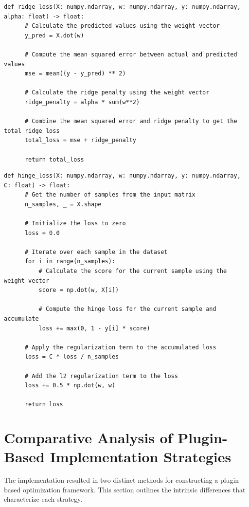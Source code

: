 \documentclass[
  a4paper,  %
  twoside,  %
  bibliography=totoc,
  headsepline,
  cleardoublepage=empty,
  parskip=half,
  draft=false
]{scrbook}
\begin{document}
\begin{lstlisting}[caption={Ridge Loss Calculation}, label=alg:ridge_loss]
  def ridge_loss(X: numpy.ndarray, w: numpy.ndarray, y: numpy.ndarray, alpha: float) -> float:
      # Calculate the predicted values using the weight vector
      y_pred = X.dot(w)

      # Compute the mean squared error between actual and predicted values
      mse = mean((y - y_pred) ** 2)

      # Calculate the ridge penalty using the weight vector
      ridge_penalty = alpha * sum(w**2)

      # Combine the mean squared error and ridge penalty to get the total ridge loss
      total_loss = mse + ridge_penalty

      return total_loss
\end{lstlisting}

\begin{lstlisting}[caption={Hinge Loss Calculation}, label=alg:hinge_loss]
  def hinge_loss(X: numpy.ndarray, w: numpy.ndarray, y: numpy.ndarray, C: float) -> float:
      # Get the number of samples from the input matrix
      n_samples, _ = X.shape

      # Initialize the loss to zero
      loss = 0.0

      # Iterate over each sample in the dataset
      for i in range(n_samples):
          # Calculate the score for the current sample using the weight vector
          score = np.dot(w, X[i])

          # Compute the hinge loss for the current sample and accumulate
          loss += max(0, 1 - y[i] * score)

      # Apply the regularization term to the accumulated loss
      loss = C * loss / n_samples

      # Add the l2 regularization term to the loss
      loss += 0.5 * np.dot(w, w)

      return loss
\end{lstlisting}

\section{Comparative Analysis of Plugin-Based Implementation Strategies}
\label{sec:differencesBetweenTheTwoPluginBasedImplementationApproaches}

The implementation resulted in two distinct methods for constructing a plugin-based optimization framework.
This section outlines the intrinsic differences that characterize each strategy.
\end{document}

